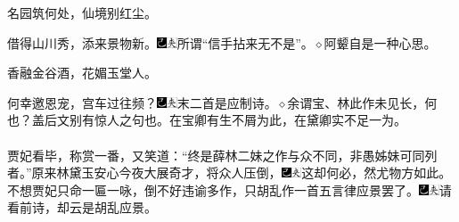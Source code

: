 名园筑何处，仙境别红尘。

借得山川秀，添来景物新。{\includegraphics[width=3mm]{../Images/00003}\includegraphics[width=3mm]{../Images/00012}\footnotesize \kaishu 所谓“信手拈来无不是”。{$\diamond$}阿颦自是一种心思。}

香融金谷酒，花媚玉堂人。

何幸邀恩宠，宫车过往频？{\includegraphics[width=3mm]{../Images/00003}\includegraphics[width=3mm]{../Images/00012}\footnotesize \kaishu 末二首是应制诗。{$\diamond$}余谓宝、林此作未见长，何也？盖后文别有惊人之句也。在宝卿有生不屑为此，在黛卿实不足一为。}
\\
\\
\indent
贾妃看毕，称赏一番，又笑道：“终是薛林二妹之作与众不同，非愚姊妹可同列者。”原来林黛玉安心今夜大展奇才，将众人压倒，{\includegraphics[width=3mm]{../Images/00003}\includegraphics[width=3mm]{../Images/00012}\footnotesize \kaishu 这却何必，然尤物方如此。}不想贾妃只命一匾一咏，倒不好违谕多作，只胡乱作一首五言律应景罢了。{\includegraphics[width=3mm]{../Images/00003}\includegraphics[width=3mm]{../Images/00012}\footnotesize \kaishu 请看前诗，却云是胡乱应景。}

